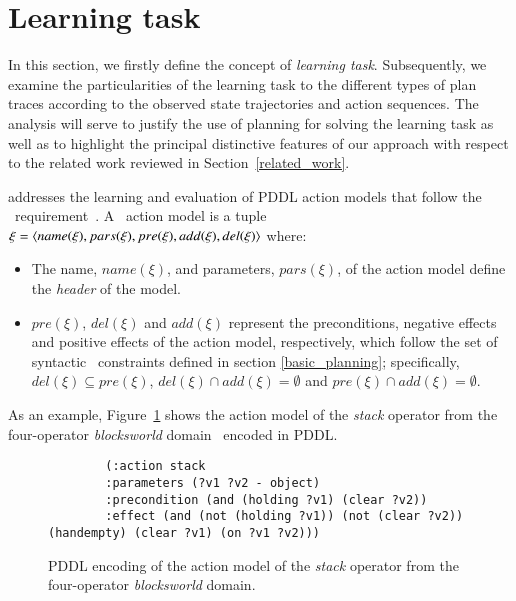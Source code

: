 
\section{Learning task}
\label{task_definition}

In this section, we firstly define the concept of \emph{learning task}. Subsequently, we examine the particularities of the learning task to the different types of plan traces according to the observed state trajectories and action sequences. The analysis will serve to justify the use of planning for solving the learning task as well as to highlight the principal distinctive features of our approach \FAMA with respect to the related work reviewed in Section~\ref{related_work}.

\vspace{0.1cm}

\FAMA addresses the learning and evaluation of PDDL action models that follow the \strips\ requirement~\cite{mcdermott1998pddl,fox2003pddl2}. A \strips\ action model is a tuple $\xi={\langle name(\xi),pars(\xi),pre(\xi),add(\xi),del(\xi) \rangle}$ where:

\begin{itemize}
	\item The name, $name(\xi)$, and parameters, $pars(\xi)$, of the action model define the {\em header} of the model.
	\item $pre(\xi)$, $del(\xi)$ and $add(\xi)$ represent the preconditions, negative effects and positive effects of the action model, respectively, which follow the set of syntactic \strips\ constraints defined in section \ref{basic_planning}; specifically, $del(\xi)\subseteq pre(\xi)$, $del(\xi)\cap add(\xi)=\emptyset$ and $pre(\xi)\cap add(\xi)=\emptyset$.
\end{itemize}


As an example, Figure~\ref{fig:stack} shows the action model of the {\em stack} operator from the four-operator {\em blocksworld} domain~\cite{slaney2001blocks} encoded in PDDL.

\begin{figure}[hbt!]
	\begin{footnotesize}
		\begin{verbatim}
		(:action stack
		:parameters (?v1 ?v2 - object)
		:precondition (and (holding ?v1) (clear ?v2))
		:effect (and (not (holding ?v1)) (not (clear ?v2)) (handempty) (clear ?v1) (on ?v1 ?v2)))
		\end{verbatim}
	\end{footnotesize}
	\caption{PDDL encoding of the action model of the {\em stack} operator from the four-operator {\em blocksworld} domain.}
	\label{fig:stack}
\end{figure}


